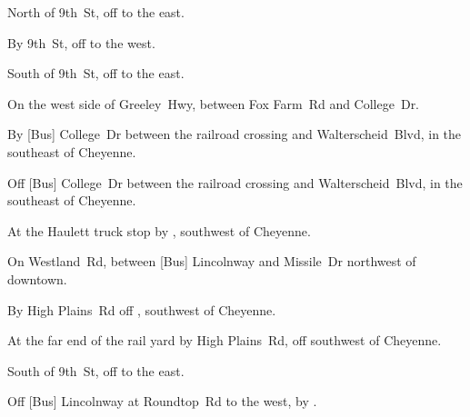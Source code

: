 
\begin{LocationList}

North of 9th~St, off   to the east.

By 9th~St, off   to the west.

South of 9th~St, off   to the east.

On the west side of  Greeley~Hwy, between Fox Farm~Rd and College~Dr.

By [Bus]  College~Dr between the railroad crossing and Walterscheid~Blvd, in the southeast of Cheyenne.

Off [Bus]  College~Dr between the railroad crossing and Walterscheid~Blvd, in the southeast of Cheyenne.

At the Haulett truck stop by  , southwest of Cheyenne.

On Westland~Rd, between [Bus] Lincolnway and Missile~Dr northwest of downtown.

By High Plains~Rd off  , southwest of Cheyenne.

At the far end of the rail yard by High Plains~Rd, off   southwest of Cheyenne.

South of 9th~St, off   to the east.

Off [Bus] Lincolnway at  Roundtop~Rd to the west, by  .

\end{LocationList}
